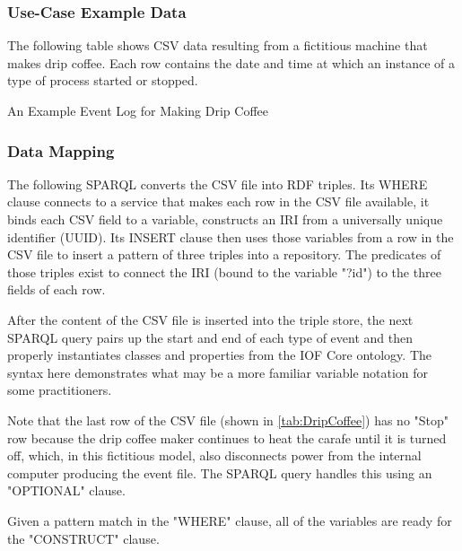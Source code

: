 \subsubsection*{Use-Case Example Data}
The following table shows CSV data resulting from a fictitious machine that makes drip coffee. Each row contains the date and time at which an instance of a type of process started or stopped.

\begin{table}[ht]
    \centering
    \caption{An Example Event Log for Making Drip Coffee}
    \label{tab:DripCoffee}
\end{table}    

\subsubsection*{Data Mapping}
The following SPARQL converts the CSV file into RDF triples. Its WHERE clause connects to a service that makes each row in the CSV file available, it binds each CSV field to a variable, constructs an IRI from a universally unique identifier (UUID). Its INSERT clause then uses those variables from a row in the CSV file to insert a pattern of three triples into a repository. The predicates of those triples exist to connect the IRI (bound to the variable "?id") to the three fields of each row.



After the content of the CSV file is inserted into the triple store, the next SPARQL query pairs up the start and end of each type of event and then properly instantiates classes and properties from the IOF Core ontology. The syntax here demonstrates what may be a more familiar variable notation for some practitioners.

Note that the last row of the CSV file (shown in \ref{tab:DripCoffee}) has no "Stop" row because the drip coffee maker continues to heat the carafe until it is turned off, which, in this fictitious model, also disconnects power from the internal computer producing the event file. The SPARQL query handles this using an "OPTIONAL" clause.

Given a pattern match in the "WHERE" clause, all of the variables are ready for the "CONSTRUCT" clause.




